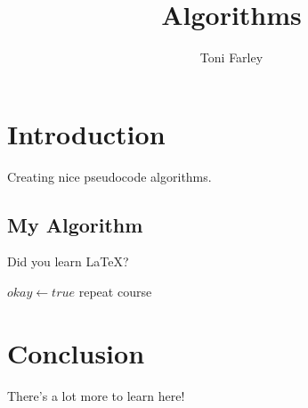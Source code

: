 \documentclass{article}
\title{Algorithms}
\author{Toni Farley}
\date{}
\begin{document}
\maketitle

\section{Introduction}

Creating nice pseudocode algorithms.

\subsection{My Algorithm}

Did you learn \LaTeX?

\begin{algorithmic}
	\State $okay \gets true$
\Else
		\State repeat course
	\EndWhile
\EndIf
\end{algorithmic}

\section{Conclusion}

There's a lot more to learn here!
\end{document}
